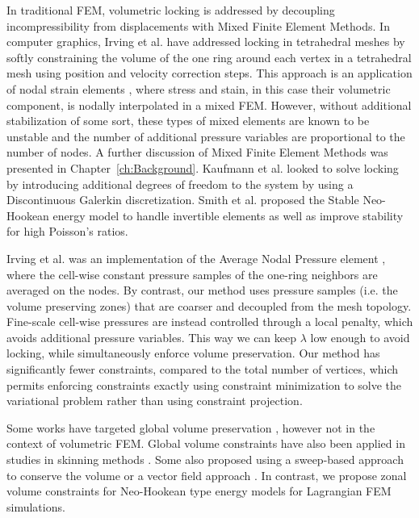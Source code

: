 In traditional FEM, volumetric locking is addressed by decoupling incompressibility from displacements with Mixed Finite Element Methods. 
In computer graphics, Irving et al. \cite{Irving:2007} have addressed locking in tetrahedral meshes by
softly constraining the volume of the one ring around each vertex in a tetrahedral mesh using position
and velocity correction steps. This approach is an application of nodal strain elements \cite{bonet:1998},
where stress and stain, in this case their volumetric component, is nodally interpolated in a mixed FEM. 
However, without additional stabilization of some sort, these types of mixed elements are known to be unstable 
and the number of additional pressure variables are proportional to the number of nodes.
A further discussion of Mixed Finite Element Methods was presented in Chapter~\ref{ch:Background}.
Kaufmann et al. \cite{Kaufmann:2012} looked to solve locking by introducing additional degrees of freedom 
to the system by using a Discontinuous Galerkin discretization. Smith et al. \cite{Smith:2018} proposed 
the Stable Neo-Hookean energy model to handle invertible elements as well as improve stability for high Poisson's ratios.

Irving et al. \cite{Irving:2007} was an implementation of the 
Average Nodal Pressure element \cite{bonet:1998}, where the cell-wise constant pressure samples of the
one-ring neighbors are averaged on the nodes. By contrast, our method uses pressure samples
(i.e. the volume preserving zones) that are coarser and decoupled from the mesh topology.
Fine-scale cell-wise pressures are instead controlled through a local penalty, which avoids
additional pressure variables.  This way we can keep $\lambda$ low enough to
avoid locking, while simultaneously enforce volume preservation.
Our method has significantly fewer constraints, compared to the total number of vertices, which
permits enforcing constraints exactly using constraint minimization to
solve the variational problem rather than using constraint projection.

Some works have targeted global volume preservation
\cite{Hong:2006,Hirota:2000,Promayon:1996,Diziol:2011}, however not in the context of volumetric
FEM.  Global volume constraints have also been applied in studies in skinning methods
\cite{Rohmer:2009}. Some also proposed using a sweep-based approach to conserve the volume
\cite{Yoon:2006,Angelidi:2004} or a vector field approach \cite{Funck:2007}. In contrast, we propose
zonal volume constraints for Neo-Hookean type energy models for Lagrangian FEM simulations.

